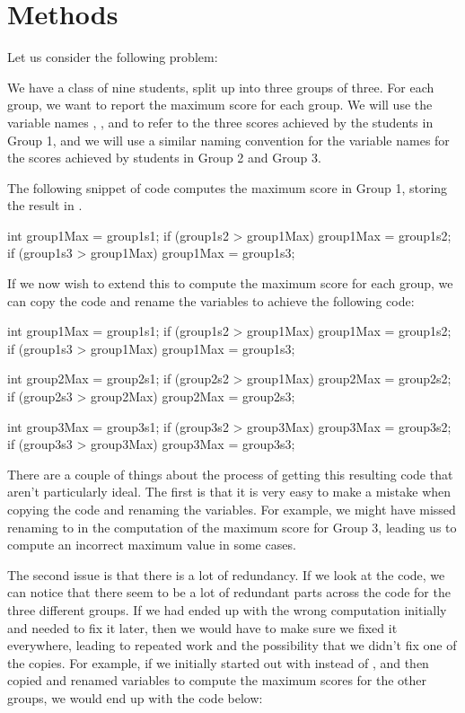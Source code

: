 \chapter{Methods}


Let us consider the following problem:

We have a class of nine students, split up into three groups of three.
For each group, we want to report the maximum score for each group.
We will use the variable names , , and 
to refer to the three scores achieved by the students in Group 1, and we will use
a similar naming convention for the variable names for the scores achieved by
students in Group 2 and Group 3.

The following snippet of code computes the maximum score in Group 1, storing
the result in .
\begin{code}
int group1Max = group1s1;
if (group1s2 > group1Max) {
  group1Max = group1s2; 
}
if (group1s3 > group1Max) {
  group1Max = group1s3; 
}
\end{code}

If we now wish to extend this to compute the maximum score for each group,
we can copy the code and rename the variables to achieve the following
code:
\begin{code}
int group1Max = group1s1;
if (group1s2 > group1Max) {
  group1Max = group1s2; 
}
if (group1s3 > group1Max) {
  group1Max = group1s3; 
}

int group2Max = group2s1;
if (group2s2 > group1Max) {
  group2Max = group2s2; 
}
if (group2s3 > group2Max) {
  group2Max = group2s3; 
}

int group3Max = group3s1;
if (group3s2 > group3Max) {
  group3Max = group3s2; 
}
if (group3s3 > group3Max) {
  group3Max = group3s3; 
}
\end{code}

\noindent There are a couple of things about the process of getting this resulting code
that aren't particularly ideal.
The first is that it is very easy to make a mistake when copying the code and renaming
the variables. For example, we might have missed renaming  to 
in the computation of the maximum score for Group 3, leading us to compute an incorrect maximum
value in some cases.

The second issue is that there is a lot of redundancy.
If we look at the code, we can notice that there seem to be a lot of redundant parts
across the code for the three different groups.
If we had ended up with the wrong computation initially and needed to fix it
later, then we would have to make sure we fixed it everywhere, leading to repeated work and the
possibility that we didn't fix one of the copies. For example, if we initially started out with
 instead of , and then copied and renamed variables
to compute the maximum scores for the other groups, we would end up with the code below:

